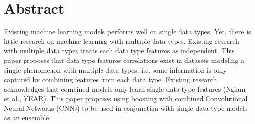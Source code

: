 
\section{Abstract}

Existing machine learning models performs well on single data types.
Yet, there is little research on machine learning with multiple data types.
Existing research with multiple data types treats each data type features as independent.
This paper proposes that data type features correlations exist in datasets modeling a single phenomenon with multiple data types,
i.e. some information is only captured by combining features from each data type.
Existing research acknowledges that combined models only learn single-data type features (Ngiam et al., YEAR).
This paper proposes using boosting with combined Convolutional Neural Networks (CNNs) to be used in conjunction with single-data type models as an ensemble.  












